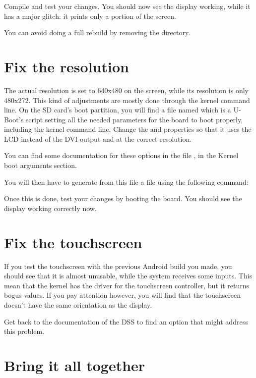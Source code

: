 Compile and test your changes. You should now see the display working, while it
has a major glitch: it prints only a portion of the screen.

You can avoid doing a full rebuild by removing the
 directory.

\section{Fix the resolution}

The actual resolution is set to 640x480 on the screen, while its resolution is
only 480x272. This kind of adjustments are mostly done through the kernel
command line. On the SD card's boot partition, you will find a file named
 which is a U-Boot's script setting all the needed parameters for the
board to boot properly, including the kernel command line. Change the
 and  properties so that it uses the LCD instead of
the DVI output and at the correct resolution.

You can find some documentation for these options in the file
, in the Kernel boot arguments section.

You will then have to generate from this  file a  file
using the following command:


Once this is done, test your changes by booting the board. You should see the
display working correctly now.

\section{Fix the touchscreen}

If you test the touchscreen with the previous Android build you made, you should
see that it is almost unusable, while the system receives some inputs. This mean
that the kernel has the driver for the touchscreen controller, but it returns
bogus values. If you pay attention however, you will find that the touchscreen
doesn't have the same orientation as the display.

Get back to the documentation of the DSS to find an option that might address
this problem.

\section{Bring it all together}

